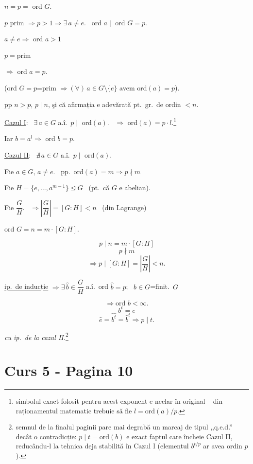\bigskip
\noindent $n=p=$ ord $G$.

\noindent $p$ prim $\Rightarrow p>1 \Rightarrow \exists\, a\neq e$. \ ord $a\mid$ ord $G=p$.

\noindent $a\neq e \Rightarrow$ ord $a>1$

\noindent $p=$prim

\noindent $\Rightarrow$ ord $a=p$.

\bigskip
\noindent\big(ord $G=p$=prim $\Rightarrow (\forall)\,a\in G\setminus\{e\}$ avem ord$(a)=p$\big).

\bigskip
\noindent pp $n>p$, $p\mid n$, şi că afirmația e adevărată pt.\ gr.\ de ordin $<n$.

\bigskip
\noindent\underline{Cazul I}: \ $\exists\, a\in G$ a.î.\ $p\mid$ ord$(a)$. \ $\Rightarrow$ ord$(a)=p\cdot l$.\footnote{simbolul exact folosit pentru acest exponent e neclar în original -- din raționamentul matematic trebuie să fie $l=\text{ord}(a)/p$.}

\noindent Iar $b=a^l \Rightarrow$ ord $b=p$.

\bigskip
\noindent\underline{Cazul II}: \ $\nexists\, a\in G$ a.î.\ $p\mid$ ord$(a)$.

\bigskip
\noindent Fie $a\in G$, $a\neq e$. \ pp.\ ord$(a)=m \Rightarrow p\nmid m$

\noindent Fie $H=\{e,\ldots,a^{m-1}\}\trianglelefteq G$ \ (pt.\ că $G$ e abelian).

\noindent Fie $\dfrac{G}{H}$. \ $\Rightarrow \left|\dfrac{G}{H}\right| = [G:H] < n$ \ (din Lagrange)

\bigskip
\noindent ord $G = n = m\cdot[G:H]$.

\[
p\mid n = m\cdot[G:H]
\]
\[
p\nmid m
\]
\[
\Rightarrow p\mid [G:H] = \left|\dfrac{G}{H}\right| < n.
\]

\bigskip
\noindent\underline{ip.\ de inducție} $\Rightarrow \exists\, \hat b\in \dfrac{G}{H}$ a.î.\ ord $\hat b=p$; \ $b\in G$=finit.\ $G$

\[
\Rightarrow \text{ord } b<\infty.
\]
\[
b^t=e
\]
\[
\hat e=\widehat{b^t}=\hat b^t \Rightarrow p\mid t.
\]

\noindent\textit{cu ip.\ de la cazul II.}\footnote{semnul de la finalul paginii pare mai degrabă un marcaj de tipul ,,q.e.d.'' decât o contradicție: $p\mid t=\text{ord}(b)$ e exact faptul care încheie Cazul II, reducându-l la tehnica deja stabilită în Cazul I (elementul $b^{t/p}$ ar avea ordin $p$).}


\section*{Curs 5 - Pagina 10}

